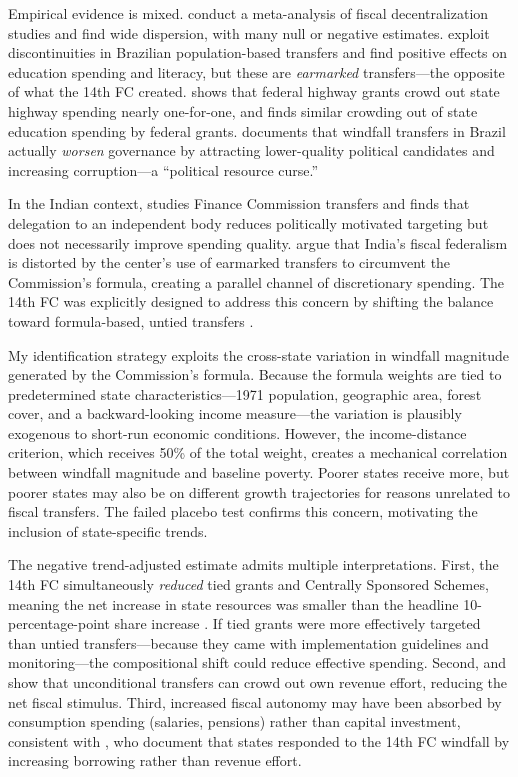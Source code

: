 \documentclass[12pt]{article}
\begin{document}
Empirical evidence is mixed. \citet{martinez2017fiscal} conduct a meta-analysis of fiscal decentralization studies and find wide dispersion, with many null or negative estimates. \citet{litschig2012intergovernmental} exploit discontinuities in Brazilian population-based transfers and find positive effects on education spending and literacy, but these are \emph{earmarked} transfers---the opposite of what the 14th FC created. \citet{knight2002endogenous} shows that federal highway grants crowd out state highway spending nearly one-for-one, and \citet{gordon2004intergovernmental} finds similar crowding out of state education spending by federal grants. \citet{brollo2013federal} documents that windfall transfers in Brazil actually \emph{worsen} governance by attracting lower-quality political candidates and increasing corruption---a ``political resource curse.''

In the Indian context, \citet{khemani2007does} studies Finance Commission transfers and finds that delegation to an independent body reduces politically motivated targeting but does not necessarily improve spending quality. \citet{rao2005political} argue that India's fiscal federalism is distorted by the center's use of earmarked transfers to circumvent the Commission's formula, creating a parallel channel of discretionary spending. The 14th FC was explicitly designed to address this concern by shifting the balance toward formula-based, untied transfers \citep{fc14report}.

My identification strategy exploits the cross-state variation in windfall magnitude generated by the Commission's formula. Because the formula weights are tied to predetermined state characteristics---1971 population, geographic area, forest cover, and a backward-looking income measure---the variation is plausibly exogenous to short-run economic conditions. However, the income-distance criterion, which receives 50\% of the total weight, creates a mechanical correlation between windfall magnitude and baseline poverty. Poorer states receive more, but poorer states may also be on different growth trajectories for reasons unrelated to fiscal transfers. The failed placebo test confirms this concern, motivating the inclusion of state-specific trends.

The negative trend-adjusted estimate admits multiple interpretations. First, the 14th FC simultaneously \emph{reduced} tied grants and Centrally Sponsored Schemes, meaning the net increase in state resources was smaller than the headline 10-percentage-point share increase \citep{chakraborty2016fiscal}. If tied grants were more effectively targeted than untied transfers---because they came with implementation guidelines and monitoring---the compositional shift could reduce effective spending. Second, \citet{smart1998taxation} and \citet{dahlberg2008using} show that unconditional transfers can crowd out own revenue effort, reducing the net fiscal stimulus. Third, increased fiscal autonomy may have been absorbed by consumption spending (salaries, pensions) rather than capital investment, consistent with \citet{pradhan2017unintended}, who document that states responded to the 14th FC windfall by increasing borrowing rather than revenue effort.
\end{document}
